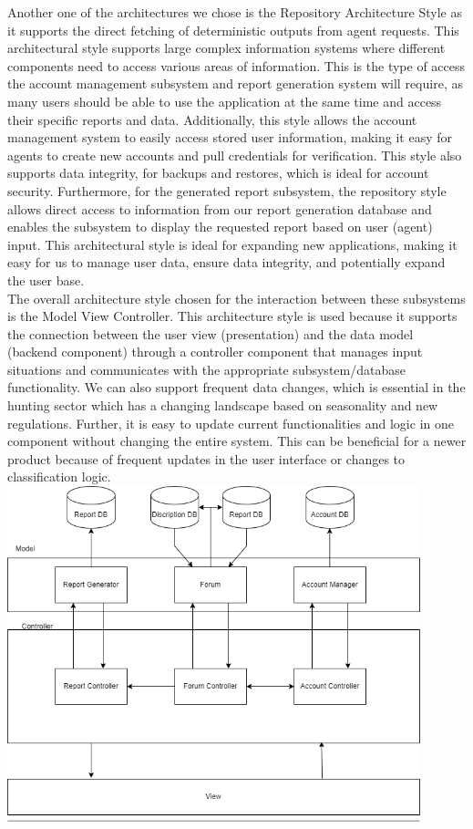 \documentclass[]{article}
\begin{document}
Another one of the architectures we chose is the Repository Architecture Style as it supports the direct fetching of deterministic outputs from agent requests. This architectural style supports large complex information systems where different components need to access various areas of information. This is the type of access the account management subsystem and report generation system will require, as many users should be able to use the application at the same time and access their specific reports and data. Additionally, this style allows the account management system to easily access stored user information, making it easy for agents to create new accounts and pull credentials for verification. This style also supports data integrity, for backups and restores, which is ideal for account security. Furthermore, for the generated report subsystem, the repository style allows direct access to information from our report generation database and enables the subsystem to display the requested report based on user (agent) input. This architectural style is ideal for expanding new applications, making it easy for us to manage user data, ensure data integrity, and potentially expand the user base.
\\

The overall architecture style chosen for the interaction between these subsystems is the Model View Controller. This architecture style is used because it supports the connection between the user view (presentation) and the data model (backend component) through a controller component that manages input situations and communicates with the appropriate subsystem/database functionality. We can also support frequent data changes, which is essential in the hunting sector which has a changing landscape based on seasonality and new regulations. Further, it is easy to update current functionalities and logic in one component without changing the entire system. This can be beneficial for a newer product because of frequent updates in the user interface or changes to classification logic.  
\\

\includegraphics[width=0.9\textwidth]{architecture.png}
\FloatBarrier
\\
\end{document}
